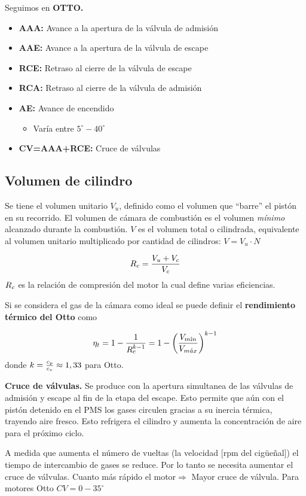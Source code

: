 Seguimos en \textbf{OTTO.}
\begin{itemize}
    \item \textbf{AAA:} Avance a la apertura de la válvula de admisión
    \item \textbf{AAE:} Avance a la apertura de la válvula de escape
    \item \textbf{RCE:} Retraso al cierre de la válvula de escape
    \item \textbf{RCA:} Retraso al cierre de la válvula de admisión
    \item \textbf{AE:} Avance de encendido
    \begin{itemize}
        \item Varía entre $5^\circ-40^\circ$
    \end{itemize}
    \item \textbf{CV=AAA+RCE:} Cruce de válvulas
\end{itemize}

\subsection{Volumen de cilindro}
Se tiene el volumen unitario $V_u$, definido como el volumen que ``barre'' el pistón en su recorrido. El volumen de cámara de combustión es el volumen \textit{mínimo} alcanzado durante la combustión. $V$ es el volumen total o cilindrada, equivalente al volumen unitario multiplicado por cantidad de cilindros: $V=V_u\cdot N$

\[
\rc=\frac{V_u+V_c}{V_c}
\]
$\rc$ es la relación de compresión del motor la cual define varias eficiencias.

Si se considera el gas de la cámara como ideal se puede definir el \textbf{rendimiento térmico del Otto} como

\[
\eta_t=1-\frac{1}{\rc^{\ctegas-1}}=1-\left(\frac{V_\min}{V_\max}\right)^{\ctegas-1}
\]
donde $\ctegas=\frac{c_p}{c_v}\approx1,33$ para Otto.

\textbf{Cruce de válvulas.} Se produce con la apertura simultanea de las válvulas de admisión y escape al fin de la etapa del escape. Esto permite que aún con el pistón detenido en el PMS los gases circulen gracias a su inercia térmica, trayendo aire fresco. Esto refrigera el cilindro y aumenta la concentración de aire para el próximo ciclo.

A medida que aumenta el número de vueltas (la velocidad [rpm del cigüeñal]) el tiempo de intercambio de gases se reduce. Por lo tanto se necesita aumentar el cruce de válvulas. Cuanto más rápido el motor$\Rightarrow$ Mayor cruce de válvula. Para motores Otto $CV=0-35^\circ$

